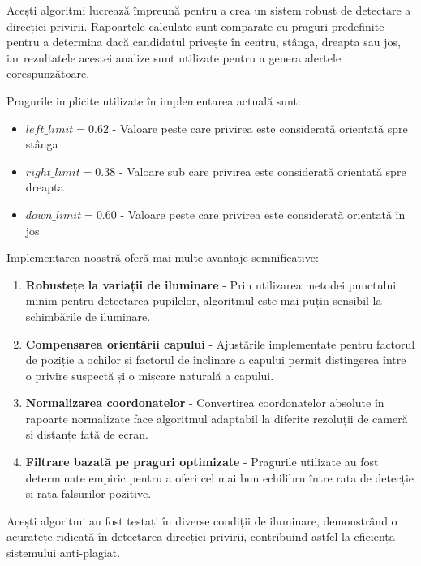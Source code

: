 \documentclass[12pt,a4paper]{article}
\begin{document}
Acești algoritmi lucrează împreună pentru a crea un sistem robust de detectare a direcției privirii. Rapoartele calculate sunt comparate cu praguri predefinite pentru a determina dacă candidatul privește în centru, stânga, dreapta sau jos, iar rezultatele acestei analize sunt utilizate pentru a genera alertele corespunzătoare.

Pragurile implicite utilizate în implementarea actuală sunt:
\begin{itemize}
    \item $left\_limit = 0.62$ - Valoare peste care privirea este considerată orientată spre stânga
    \item $right\_limit = 0.38$ - Valoare sub care privirea este considerată orientată spre dreapta
    \item $down\_limit = 0.60$ - Valoare peste care privirea este considerată orientată în jos
\end{itemize}

Implementarea noastră oferă mai multe avantaje semnificative:

\begin{enumerate}
    \item \textbf{Robustețe la variații de iluminare} - Prin utilizarea metodei punctului minim pentru detectarea pupilelor, algoritmul este mai puțin sensibil la schimbările de iluminare.
    
    \item \textbf{Compensarea orientării capului} - Ajustările implementate pentru factorul de poziție a ochilor și factorul de înclinare a capului permit distingerea între o privire suspectă și o mișcare naturală a capului.
    
    \item \textbf{Normalizarea coordonatelor} - Convertirea coordonatelor absolute în rapoarte normalizate face algoritmul adaptabil la diferite rezoluții de cameră și distanțe față de ecran.
    
    \item \textbf{Filtrare bazată pe praguri optimizate} - Pragurile utilizate au fost determinate empiric pentru a oferi cel mai bun echilibru între rata de detecție și rata falsurilor pozitive.
\end{enumerate}

Acești algoritmi au fost testați în diverse condiții de iluminare, demonstrând o acuratețe ridicată în detectarea direcției privirii, contribuind astfel la eficiența sistemului anti-plagiat.
\end{document}

